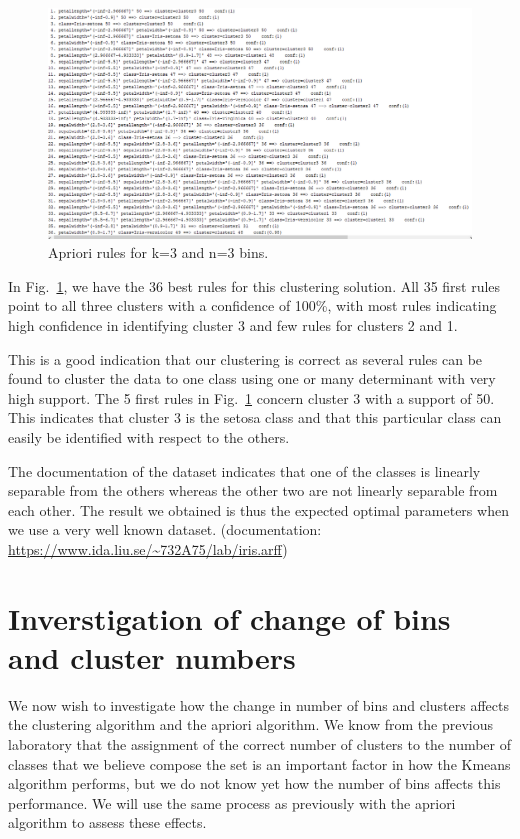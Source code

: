 \documentclass[letterpaper,12pt]{article}
\begin{document}
\begin{figure}[H] 
  \centering
      \includegraphics[width=0.8\columnwidth]{3_bins_3cl_apriori_rules}
        \caption{
                \label{fig:3bins_3cl_apriori}  
                Apriori rules for k=3 and n=3 bins.
        }
\end{figure}

In Fig.~\ref{fig:3bins_3cl_apriori}, we have the 36 best rules for this clustering solution. All 35 first rules point to all three clusters with a confidence of 100\%, with most rules indicating high confidence in identifying cluster 3 and few rules for clusters 2 and 1.

This is a good indication that our clustering is correct as several rules can be found to cluster the data to one class using one or many determinant with very high support. The 5 first rules in Fig.~\ref{fig:3bins_3cl_apriori} concern cluster 3 with a support of 50. This indicates that cluster 3 is the setosa class and that this particular class can easily be identified with respect to the others.

The documentation of the dataset indicates that one of the classes is linearly separable from the others whereas the other two are not linearly separable from each other. The result we obtained is thus the expected optimal parameters when we use a very well known dataset. (documentation: \url{https://www.ida.liu.se/~732A75/lab/iris.arff})

\section{Inverstigation of change of bins and cluster numbers}

We now wish to investigate how the change in number of bins and clusters affects the clustering algorithm and the apriori algorithm. We know from the previous laboratory that the assignment of the correct number of clusters to the number of classes that we believe compose the set is an important factor in how the Kmeans algorithm performs, but we do not know yet how the number of bins affects this performance. We will use the same process as previously with the apriori algorithm to assess these effects.
\end{document}
